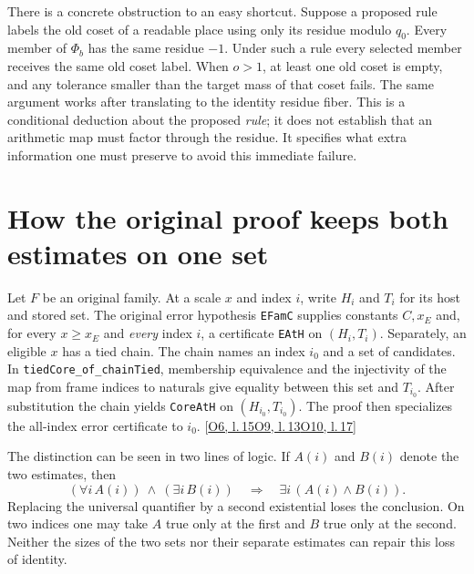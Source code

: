 \documentclass[12pt,letterpaper]{article}
\newcommand{\id}[1]{{\small\nolinkurl{#1}}}
\begin{document}
There is a concrete obstruction to an easy shortcut. Suppose a proposed rule labels the old coset of a readable place using only its residue modulo $q_0$. Every member of $\Phi_b$ has the same residue $-1$. Under such a rule every selected member receives the same old coset label. When $o>1$, at least one old coset is empty, and any tolerance smaller than the target mass of that coset fails. The same argument works after translating to the identity residue fiber. This is a conditional deduction about the proposed \emph{rule}; it does not establish that an arithmetic map must factor through the residue. It specifies what extra information one must preserve to avoid this immediate failure.

\section{How the original proof keeps both estimates on one set}\label{sec:consumer}
Let $F$ be an original family. At a scale $x$ and index $i$, write $H_i$ and $T_i$ for its host and stored set. The original error hypothesis \id{EFamC} supplies constants $C,x_E$ and, for every $x\geq x_E$ and \emph{every} index $i$, a certificate \id{EAtH} on $(H_i,T_i)$. Separately, an eligible $x$ has a tied chain. The chain names an index $i_0$ and a set of candidates. In \id{tiedCore_of_chainTied}, membership equivalence and the injectivity of the map from frame indices to naturals give equality between this set and $T_{i_0}$. After substitution the chain yields \id{CoreAtH} on $(H_{i_0},T_{i_0})$. The proof then specializes the all-index error certificate to $i_0$. {\footnotesize\sffamily\color{mute}[\href{https://github.com/nousentllc/riemann-hypothesis/blob/40e56bab026552e089d7afcfeff08d2defb9c005/src/Formalism/SharpRestriction/RamificationFrobenius/TotientGaloisClasses/TopDefs.lean\#L15}{O6, l.\,15}\enspace \href{https://github.com/nousentllc/riemann-hypothesis/blob/40e56bab026552e089d7afcfeff08d2defb9c005/src/Development/AutomorphicArithmetic/PrimitiveCosets/LevelGmLeOnFamilyScales.lean\#L13}{O9, l.\,13}\enspace \href{https://github.com/nousentllc/riemann-hypothesis/blob/40e56bab026552e089d7afcfeff08d2defb9c005/src/Development/AutomorphicArithmetic/PrimitiveCosets/WindowInequalityOfArtinInputs.lean\#L17}{O10, l.\,17}]}

The distinction can be seen in two lines of logic. If $A(i)$ and $B(i)$ denote the two estimates, then
\[
        (\forall i\, A(i))\ \wedge\ (\exists i\,B(i))
              \quad\Longrightarrow\quad \exists i\,(A(i)\wedge B(i)).
\]
Replacing the universal quantifier by a second existential loses the conclusion. On two indices one may take $A$ true only at the first and $B$ true only at the second. Neither the sizes of the two sets nor their separate estimates can repair this loss of identity.
\end{document}
